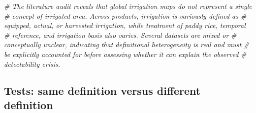 \documentclass[
  11pt,
]{article}
\newenvironment{Shaded}{\begin{snugshade}}{\end{snugshade}}
\newcommand{\CommentTok}[1]{\textcolor[rgb]{0.56,0.35,0.01}{\textit{#1}}}
\begin{document}
\begin{Shaded}
\begin{Highlighting}[]
\CommentTok{\# The literature audit reveals that global irrigation maps do not represent a single}
\CommentTok{\# concept of irrigated area. Across products, irrigation is variously defined as}
\CommentTok{\# equipped, actual, or harvested irrigation, while treatment of paddy rice, temporal}
\CommentTok{\# reference, and irrigation basis also varies. Several datasets are mixed or}
\CommentTok{\# conceptually unclear, indicating that definitional heterogeneity is real and must}
\CommentTok{\# be explicitly accounted for before assessing whether it can explain the observed}
\CommentTok{\# detectability crisis.}
\end{Highlighting}
\end{Shaded}

\subsection{Tests: same definition versus different
definition}\label{tests-same-definition-versus-different-definition}
\end{document}
